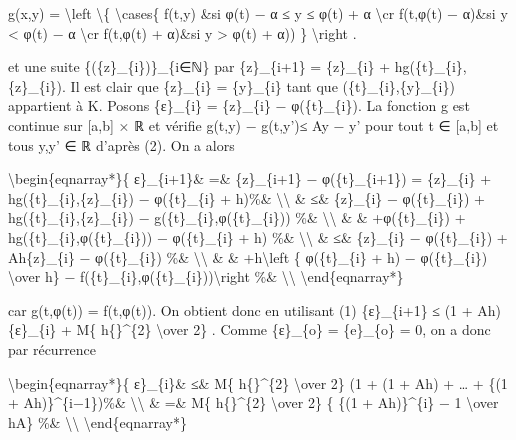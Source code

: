 \documentclass[]{article}
\begin{document}
g(x,y) = \textbackslash{}left \textbackslash{}\{ \textbackslash{}cases\{
f(t,y) \&si φ(t) − α ≤ y ≤ φ(t) + α \textbackslash{}cr f(t,φ(t) − α)\&si
y \textless{} φ(t) − α \textbackslash{}cr f(t,φ(t) + α)\&si y
\textgreater{} φ(t) + α)) \} \textbackslash{}right .

et une suite \{(\{z\}\_\{i\})\}\_\{i∈ℕ\} par \{z\}\_\{i+1\} =
\{z\}\_\{i\} + hg(\{t\}\_\{i\},\{z\}\_\{i\}). Il est clair que
\{z\}\_\{i\} = \{y\}\_\{i\} tant que (\{t\}\_\{i\},\{y\}\_\{i\})
appartient à K. Posons \{ε\}\_\{i\} = \textbar{}\{z\}\_\{i\} −
φ(\{t\}\_\{i\})\textbar{}. La fonction g est continue sur {[}a,b{]} × ℝ
et vérifie \textbar{}g(t,y) − g(t,y')\textbar{}≤ A\textbar{}y −
y'\textbar{} pour tout t ∈ {[}a,b{]} et tous y,y' ∈ ℝ d'après (2). On a
alors

\textbackslash{}begin\{eqnarray*\}\{ ε\}\_\{i+1\}\& =\&
\textbar{}\{z\}\_\{i+1\} − φ(\{t\}\_\{i+1\})\textbar{} =
\textbar{}\{z\}\_\{i\} + hg(\{t\}\_\{i\},\{z\}\_\{i\}) − φ(\{t\}\_\{i\}
+ h)\textbar{}\%\& \textbackslash{}\textbackslash{} \& ≤\&
\textbar{}\{z\}\_\{i\} − φ(\{t\}\_\{i\})\textbar{} +
\textbar{}h\textbar{}\textbar{}g(\{t\}\_\{i\},\{z\}\_\{i\}) −
g(\{t\}\_\{i\},φ(\{t\}\_\{i\}))\textbar{} \%\&
\textbackslash{}\textbackslash{} \& \& +\textbar{}φ(\{t\}\_\{i\}) +
hg(\{t\}\_\{i\},φ(\{t\}\_\{i\})) − φ(\{t\}\_\{i\} + h)\textbar{} \%\&
\textbackslash{}\textbackslash{} \& ≤\& \textbar{}\{z\}\_\{i\} −
φ(\{t\}\_\{i\})\textbar{} + A\textbar{}h\textbar{}\textbar{}\{z\}\_\{i\}
− φ(\{t\}\_\{i\})\textbar{} \%\& \textbackslash{}\textbackslash{} \& \&
+\textbar{}h\textbar{}\textbackslash{}left \textbar{}\{ φ(\{t\}\_\{i\} +
h) − φ(\{t\}\_\{i\}) \textbackslash{}over h\} −
f(\{t\}\_\{i\},φ(\{t\}\_\{i\}))\textbackslash{}right \textbar{} \%\&
\textbackslash{}\textbackslash{} \textbackslash{}end\{eqnarray*\}

car g(t,φ(t)) = f(t,φ(t)). On obtient donc en utilisant (1)
\{ε\}\_\{i+1\} ≤ (1 + A\textbar{}h\textbar{})\{ε\}\_\{i\} + M\{
\textbar{}h\{\textbar{}\}\^{}\{2\} \textbackslash{}over 2\} . Comme
\{ε\}\_\{o\} = \{e\}\_\{o\} = 0, on a donc par récurrence

\textbackslash{}begin\{eqnarray*\}\{ ε\}\_\{i\}\& ≤\& M\{
\textbar{}h\{\textbar{}\}\^{}\{2\} \textbackslash{}over 2\} (1 + (1 +
A\textbar{}h\textbar{}) + \ldots{} + \{(1 +
A\textbar{}h\textbar{})\}\^{}\{i−1\})\%\&
\textbackslash{}\textbackslash{} \& =\& M\{
\textbar{}h\{\textbar{}\}\^{}\{2\} \textbackslash{}over 2\} \{ \{(1 +
A\textbar{}h\textbar{})\}\^{}\{i\} − 1 \textbackslash{}over
\textbar{}h\textbar{}A\} \%\& \textbackslash{}\textbackslash{}
\textbackslash{}end\{eqnarray*\}
\end{document}
